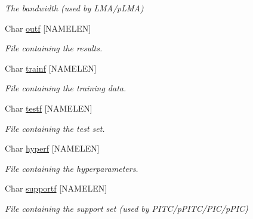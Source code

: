 \begin{DoxyCompactItemize}
\begin{DoxyCompactList}\small\item\em The bandwidth (used by L\+M\+A/p\+L\+M\+A) \end{DoxyCompactList}\item 
\hypertarget{structt__command__demo_a5243a68b75cfdcd0787feb1d1a24cdd9}{Char \hyperlink{structt__command__demo_a5243a68b75cfdcd0787feb1d1a24cdd9}{outf} \mbox{[}N\+A\+M\+E\+L\+E\+N\mbox{]}}\label{structt__command__demo_a5243a68b75cfdcd0787feb1d1a24cdd9}

\begin{DoxyCompactList}\small\item\em File containing the results. \end{DoxyCompactList}\item 
\hypertarget{structt__command__demo_a4caa14253026ed57aacca438cd672bb0}{Char \hyperlink{structt__command__demo_a4caa14253026ed57aacca438cd672bb0}{trainf} \mbox{[}N\+A\+M\+E\+L\+E\+N\mbox{]}}\label{structt__command__demo_a4caa14253026ed57aacca438cd672bb0}

\begin{DoxyCompactList}\small\item\em File containing the training data. \end{DoxyCompactList}\item 
\hypertarget{structt__command__demo_a84873e5db588a94bca1f35551bf034e4}{Char \hyperlink{structt__command__demo_a84873e5db588a94bca1f35551bf034e4}{testf} \mbox{[}N\+A\+M\+E\+L\+E\+N\mbox{]}}\label{structt__command__demo_a84873e5db588a94bca1f35551bf034e4}

\begin{DoxyCompactList}\small\item\em File containing the test set. \end{DoxyCompactList}\item 
\hypertarget{structt__command__demo_a3b5a4c26250a768829e7e7e3622774dc}{Char \hyperlink{structt__command__demo_a3b5a4c26250a768829e7e7e3622774dc}{hyperf} \mbox{[}N\+A\+M\+E\+L\+E\+N\mbox{]}}\label{structt__command__demo_a3b5a4c26250a768829e7e7e3622774dc}

\begin{DoxyCompactList}\small\item\em File containing the hyperparameters. \end{DoxyCompactList}\item 
\hypertarget{structt__command__demo_a2253b0a9e63110ee5b1839122307e678}{Char \hyperlink{structt__command__demo_a2253b0a9e63110ee5b1839122307e678}{supportf} \mbox{[}N\+A\+M\+E\+L\+E\+N\mbox{]}}\label{structt__command__demo_a2253b0a9e63110ee5b1839122307e678}

\begin{DoxyCompactList}\small\item\em File containing the support set (used by P\+I\+T\+C/p\+P\+I\+T\+C/\+P\+I\+C/p\+P\+I\+C) \end{DoxyCompactList}\end{DoxyCompactItemize}


